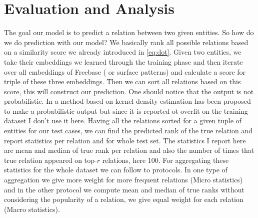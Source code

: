 \section{Evaluation and Analysis}
\label{sec:textkb-exp-eval}

The goal our model is to predict a relation between
two given entities. So how do we do prediction with our model? We basically rank
all possible relations based on a similarity score we already introduced in
\eqref{eq:dot}. Given two entities, we take their embeddings we learned through
the training phase and then iterate over all embeddings of Freebase ( or
surface patterns) and calculate a score for triple of these three embeddings.
Then we can sort all relations based on this score, this will construct our
prediction. One should notice that the output is not probabilistic. In
\cite{Bordes2011} a method based on kernel density estimation has been proposed
to make a probabilistic output but since it is reported ot overfit on the
training dataset I don't use it here. 
Having all the relations sorted for a given tuple of entities for our test
cases, we can find the predicted rank of the true relation and report statistics
per relation and for whole test set. The statistics I report here are mean and
median of true rank per relation and also the number of times that true relation
appeared on top-$r$ relations, here 100. For aggregating these statistics for
the whole dataset we can follow to protocols. In one type of aggregation we
give more weight for more frequent relations (Micro statistics) and in the other
protocol we compute mean and median of true ranks without considering the
popularity of a relation, we give equal weight for each relation (Macro
statistics).

